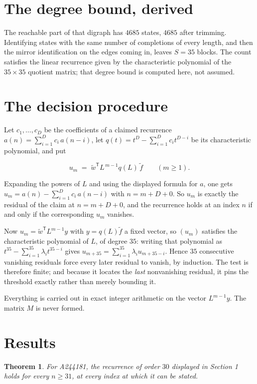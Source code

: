 \documentclass[11pt]{article}
\newtheorem{theorem}{Theorem}
\theoremstyle{definition}
\begin{document}
\section{The degree bound, derived}

The reachable part of that digraph has $4685$ states, $4685$ after trimming. Identifying states with the same number of completions of every length, and then the mirror identification on the edges coming in, leaves $S = 35$ blocks. The count satisfies the linear recurrence given by the characteristic polynomial of the $35\times35$ quotient matrix; that degree bound is computed here, not assumed.

\section{The decision procedure}

Let $c_1,\dots,c_D$ be the coefficients of a claimed recurrence $a(n) = \sum_{i=1}^{D} c_i\,a(n-i)$, let $q(t) = t^{D} - \sum_{i=1}^{D} c_i t^{D-i}$ be its characteristic polynomial, and put

\[u_m \;=\; \tilde w^{\mathsf T} L^{\,m-1} q(L)\,\tilde f \qquad (m \ge 1).\]

Expanding the powers of $L$ and using the displayed formula for $a$, one gets $u_m = a(n) - \sum_{i=1}^{D} c_i\,a(n-i)$ with $n = m + D + 0$. So $u_m$ is exactly the residual of the claim at $n = m + D + 0$, and the recurrence holds at an index $n$ if and only if the corresponding $u_m$ vanishes.

Now $u_m = \tilde w^{\mathsf T} L^{m-1} y$ with $y = q(L)\tilde f$ a fixed vector, so $(u_m)$ satisfies the characteristic polynomial of $L$, of degree $35$: writing that polynomial as $t^{35} - \sum_{i=1}^{35} \lambda_i t^{35-i}$ gives $u_{m+35} = \sum_{i=1}^{35} \lambda_i u_{m+35-i}$. Hence $35$ consecutive vanishing residuals force every later residual to vanish, by induction. The test is therefore finite; and because it locates the {\itshape last} nonvanishing residual, it pins the threshold exactly rather than merely bounding it.

Everything is carried out in exact integer arithmetic on the vector $L^{m-1}y$. The matrix $M$ is never formed.

\section{Results}

\begin{theorem} For A244181, the recurrence of order $30$ displayed in Section 1 holds for every $n \ge 31$, at every index at which it can be stated.\end{theorem}
\end{document}

